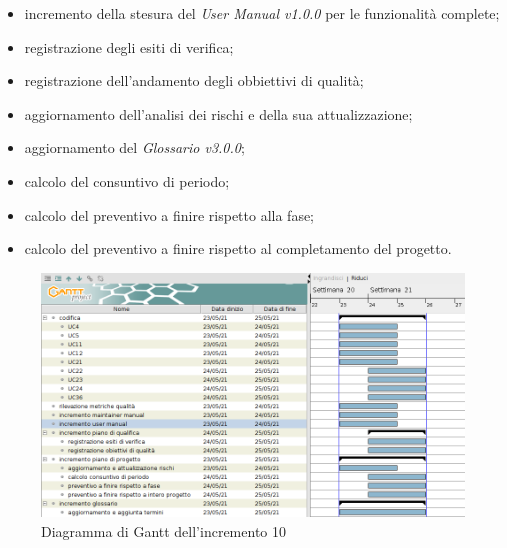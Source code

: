 \begin{itemize}
\begin{itemize}
              \item incremento della stesura del \textit{User Manual v1.0.0} per le funzionalità complete;
              \item registrazione degli esiti di verifica;
              \item registrazione dell'andamento degli obbiettivi di qualità;
              \item aggiornamento dell'analisi dei rischi e della sua attualizzazione;
              \item aggiornamento del \textit{Glossario v3.0.0};
              \item calcolo del consuntivo di periodo;
              \item calcolo del preventivo a finire rispetto alla fase;
              \item calcolo del preventivo a finire rispetto al completamento del progetto.
          \end{itemize}
\end{itemize}
\begin{figure}[!ht]
    \caption{Diagramma di Gantt dell'incremento 10}
    \vspace{5px}
    \includegraphics[scale=0.3]{../../../Images/Diagrammi/Gantt/incremento10.png}
    \centering
\end{figure}

